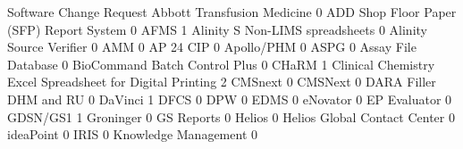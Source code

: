 \documentclass{article}
\begin{document}
\begin{Schunk}
\begin{Soutput}
                                                            Software Change Request
  Abbott Transfusion Medicine                                                     0
  ADD Shop Floor Paper (SFP) Report System                                        0
  AFMS                                                                            1
  Alinity S Non-LIMS spreadsheets                                                 0
  Alinity Source Verifier                                                         0
  AMM                                                                             0
  AP 24 CIP                                                                       0
  Apollo/PHM                                                                      0
  ASPG                                                                            0
  Assay File Database                                                             0
  BioCommand Batch Control Plus                                                   0
  CHaRM                                                                           1
  Clinical Chemistry Excel Spreadsheet for Digital Printing                       2
  CMSnext                                                                         0
  CMSNext                                                                         0
  DARA Filler DHM and RU                                                          0
  DaVinci                                                                         1
  DFCS                                                                            0
  DPW                                                                             0
  EDMS                                                                            0
  eNovator                                                                        0
  EP Evaluator                                                                    0
  GDSN/GS1                                                                        1
  Groninger                                                                       0
  GS Reports                                                                      0
  Helios                                                                          0
  Helios Global Contact Center                                                    0
  ideaPoint                                                                       0
  IRIS                                                                            0
  Knowledge Management                                                            0

\end{Soutput}
\end{Schunk}
\end{document}

